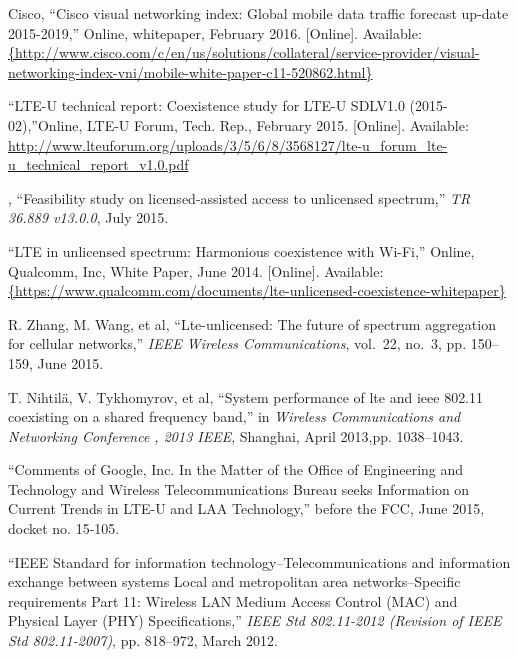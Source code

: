 %

\begin{thebibliography}{99.}%
	
	
	
	 Cisco, ``{Cisco visual networking index: Global mobile data traffic forecast up-date 2015-2019},'' Online, whitepaper, February 2016. [Online]. Available: \url{{http://www.cisco.com/c/en/us/solutions/collateral/service-provider/visual-networking-index-vni/mobile-white-paper-c11-520862.html}}
	
	``{LTE-U technical report: Coexistence study for LTE-U SDLV1.0 (2015-02)},''Online, LTE-U Forum, Tech. Rep., February 2015. [Online]. Available: \url{http://www.lteuforum.org/uploads/3/5/6/8/3568127/lte-u\_forum\_lte-u\_technical\_report\_v1.0.pdf}
	
	, ``Feasibility study on licensed-assisted access to unlicensed spectrum,'' \emph{{TR 36.889 v13.0.0}}, July 2015.
	
	
	``{LTE in unlicensed spectrum: Harmonious coexistence with Wi-Fi},'' Online, Qualcomm, Inc, White Paper, June 2014. [Online]. Available: \url{{https://www.qualcomm.com/documents/lte-unlicensed-coexistence-whitepaper}}
	
	 {R. Zhang, M. Wang, et al}, ``Lte-unlicensed: The future of spectrum aggregation for cellular networks,'' \emph{IEEE Wireless Communications}, vol.~22, no.~3, pp. 150--159, June 2015.
	
	 {T. Nihtil{\"a}, V. Tykhomyrov, et al}, ``System performance of lte and ieee 802.11 coexisting on a shared frequency band,'' in \emph{Wireless Communications and Networking Conference , 2013 IEEE}, Shanghai, April 2013,pp. 1038--1043.
	
	 ``{Comments of {G}oogle, {I}nc. In the Matter of the Office of Engineering and Technology and Wireless Telecommunications Bureau seeks Information on Current Trends in LTE-U and LAA Technology},'' before the FCC, June 2015, docket no. 15-105.
	
	``{IEEE Standard for information technology--Telecommunications and information exchange between systems Local and metropolitan area networks--Specific requirements Part 11: Wireless LAN Medium Access Control (MAC) and Physical Layer (PHY) Specifications},'' \emph{{IEEE Std 802.11-2012 (Revision of IEEE Std 802.11-2007)}}, pp. 818--972, March 2012.
	

\end{thebibliography}
